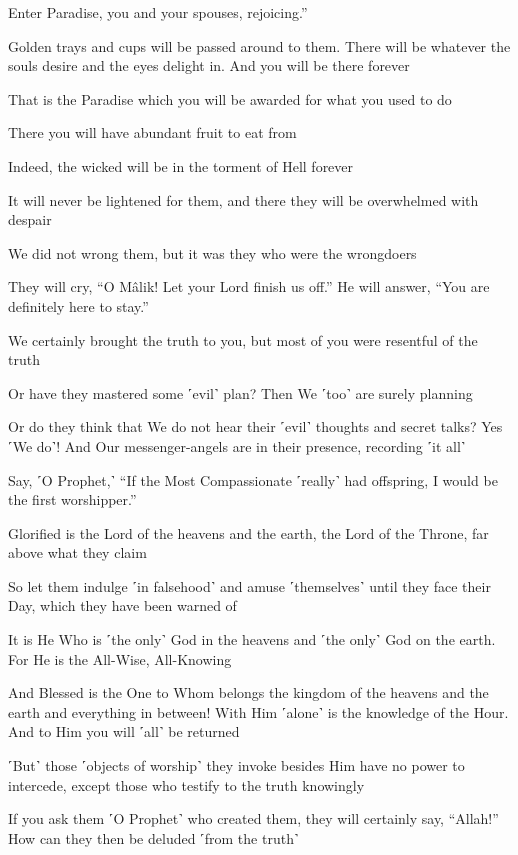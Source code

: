 Enter Paradise, you and your spouses, rejoicing.”

Golden trays and cups will be passed around to them. There will be whatever the souls desire and the eyes delight in. And you will be there forever

That is the Paradise which you will be awarded for what you used to do

There you will have abundant fruit to eat from

Indeed, the wicked will be in the torment of Hell forever

It will never be lightened for them, and there they will be overwhelmed with despair

We did not wrong them, but it was they who were the wrongdoers

They will cry, “O Mâlik! Let your Lord finish us off.” He will answer, “You are definitely here to stay.”

We certainly brought the truth to you, but most of you were resentful of the truth

Or have they mastered some ˹evil˺ plan? Then We ˹too˺ are surely planning

Or do they think that We do not hear their ˹evil˺ thoughts and secret talks? Yes ˹We do˺! And Our messenger-angels are in their presence, recording ˹it all˺

Say, ˹O Prophet,˺ “If the Most Compassionate ˹really˺ had offspring, I would be the first worshipper.”

Glorified is the Lord of the heavens and the earth, the Lord of the Throne, far above what they claim

So let them indulge ˹in falsehood˺ and amuse ˹themselves˺ until they face their Day, which they have been warned of

It is He Who is ˹the only˺ God in the heavens and ˹the only˺ God on the earth. For He is the All-Wise, All-Knowing

And Blessed is the One to Whom belongs the kingdom of the heavens and the earth and everything in between! With Him ˹alone˺ is the knowledge of the Hour. And to Him you will ˹all˺ be returned

˹But˺ those ˹objects of worship˺ they invoke besides Him have no power to intercede, except those who testify to the truth knowingly

If you ask them ˹O Prophet˺ who created them, they will certainly say, “Allah!” How can they then be deluded ˹from the truth˺

